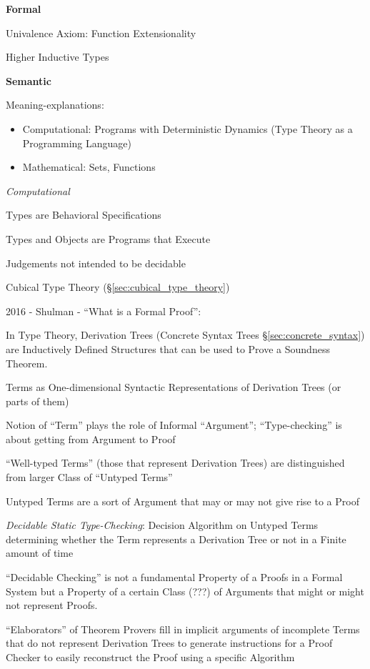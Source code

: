 
\textbf{Formal}

Univalence Axiom: Function Extensionality

Higher Inductive Types


\textbf{Semantic}

Meaning-explanations:
\begin{itemize}
  \item Computational: Programs with Deterministic Dynamics (Type
    Theory as a Programming Language)
  \item Mathematical: Sets, Functions
\end{itemize}

\emph{Computational}

Types are Behavioral Specifications

Types and Objects are Programs that Execute

Judgements not intended to be decidable

Cubical Type Theory (\S\ref{sec:cubical_type_theory})


\asterism


2016 - Shulman - ``What is a Formal Proof'': %

In Type Theory, Derivation Trees (Concrete Syntax Trees
\S\ref{sec:concrete_syntax}) are Inductively Defined Structures that
can be used to Prove a Soundness Theorem.

Terms as One-dimensional Syntactic Representations of Derivation Trees
(or parts of them)

Notion of ``Term'' plays the role of Informal ``Argument'';
``Type-checking'' is about getting from Argument to Proof

``Well-typed Terms'' (those that represent Derivation Trees) are
distinguished from larger Class of ``Untyped Terms''

Untyped Terms are a sort of Argument that may or may not give rise to
a Proof

\emph{Decidable Static Type-Checking}: Decision Algorithm on Untyped
Terms determining whether the Term represents a Derivation Tree or not
in a Finite amount of time

``Decidable Checking'' is not a fundamental Property of a Proofs in a
Formal System but a Property of a certain Class (???) of Arguments
that might or might not represent Proofs.

``Elaborators'' of Theorem Provers fill in implicit arguments of
incomplete Terms that do not represent Derivation Trees to generate
instructions for a Proof Checker to easily reconstruct the Proof using
a specific Algorithm


